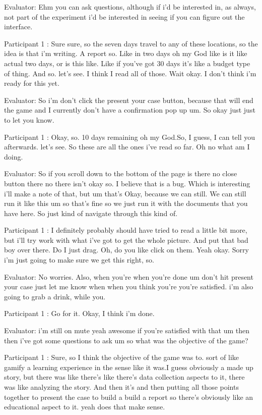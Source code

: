 \documentclass{l4proj}
\begin{document}
\begin{appendices}
Evaluator: Ehm you can ask questions, although if i'd be interested in, as always, not part of the experiment i'd be interested in seeing if you can figure out the interface.

Participant 1 : Sure sure, so the seven days travel to any of these locations, so the idea is that i'm writing. A report so. Like in two days oh my God like is it like actual two days, or is this like. Like if you've got 30 days it's like a budget type of thing. And so. let's see. I think I read all of those. Wait okay. I don't think i'm ready for this yet.

Evaluator: So i'm don't click the present your case button, because that will end the game and I currently don't have a confirmation pop up um. So okay just just to let you know.

Participant 1 : Okay, so. 10 days remaining oh my God.So, I guess, I can tell you afterwards.  let's see. So these are all the ones i've read so far. Oh no what am I doing.

Evaluator:  So if you scroll down to the bottom of the page is there no close button there no there isn't okay so. I believe that is a bug. Which is interesting i'll make a note of that, but um that's Okay, because we can still. We can still run it like this um so that's fine so we just run it with the documents that you have here. So just kind of navigate through this kind of.

Participant 1 : I definitely probably should have tried to read a little bit more, but i'll try work with what i've got to get the whole picture. And put that bad boy over there. Do I just drag. Oh, do you like click on them. Yeah okay. Sorry i'm just going to make sure we get this right, so.

Evaluator: No worries. Also, when you're when you're done um don't hit present your case just let me know when when you think you're you're satisfied. i'm also going to grab a drink, while you.

Participant 1 : Go for it. Okay, I think i'm done.

Evaluator: i'm still on mute yeah awesome if you're satisfied with that um then then i've got some questions to ask um so what was the objective of the game?

Participant 1 : Sure, so I think the objective of the game was to. sort of like gamify a learning experience in the sense like it was.I guess obviously a made up story, but there was like there's like there's data collection aspects to it, there was like analyzing the story. And then it's and then putting all those points together to present the case to build a build a report so there's obviously like an educational aspect to it. yeah does that make sense.


\end{appendices}
\end{document}
